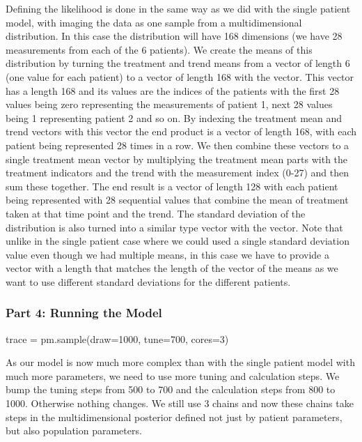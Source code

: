 \documentclass[12pt,a4paper,leqno]{report}
\theoremstyle{plain}
\theoremstyle{definition}
\theoremstyle{remark}
\begin{document}
Defining the likelihood is done in the same way as we did with the single patient model,
with imaging the data as one sample from a multidimensional distribution. In this case the
distribution will have 168 dimensions (we have 28 measurements from each of the 6 patients). We
create the means of this distribution by turning the treatment and trend means from
a vector of length 6 (one value for each patient) to a vector of length 168 with the
 vector. This vector has a length 168 and its values are the indices of the
patients with the first 28 values being
zero representing the measurements of patient 1, next 28 values being 1 representing
patient 2 and so on. By indexing the treatment mean and trend vectors with this vector the end
product is a vector of length 168, with each patient being represented 28 times
in a row. We then combine these vectors to a single treatment mean vector by multiplying
the treatment mean parts with the treatment indicators and the trend with the
measurement index (0-27) and then sum these together. The end result is a
vector of length 128 with each patient being represented with 28 sequential values that
combine the mean of treatment taken at that time point and the trend. The standard
deviation of the distribution is also turned into a similar type vector with the
 vector. Note that unlike in the single patient case where we could used a single
standard deviation value even though we had multiple means, in this case we have to
provide a vector with a length that matches the length of the vector of the means as we
want to use different standard deviations for the different patients.

\subsubsection*{Part 4: Running the Model}

\bigskip
\begin{pyverbatim}[][fontsize=\footnotesize]
    trace = pm.sample(draw=1000, tune=700, cores=3)
\end{pyverbatim}
\bigskip

As our model is now much more complex than with the single patient model with much
more parameters, we need to use more tuning and calculation steps.
We bump the tuning steps from 500 to 700 and the calculation steps from 800 to 1000.
Otherwise nothing changes. We still use 3 chains and now these chains take
steps in the multidimensional posterior defined not just by patient parameters, but also
population parameters.
\end{document}
